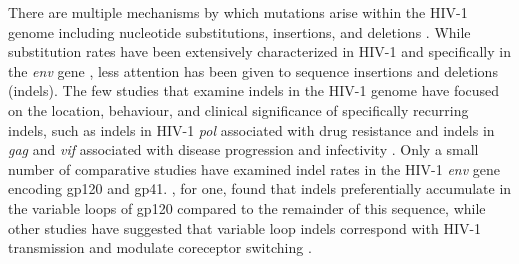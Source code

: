 \documentclass[12pt]{article}
\begin{document}
There are multiple mechanisms by which mutations arise within the HIV-1 genome including nucleotide substitutions, insertions, and deletions \citep{Abram:2010}.
While substitution rates have been extensively characterized in HIV-1 and specifically in the \textit{env} gene \citep{Keulen:1996, Nielsen:1998}, less attention has been given to sequence insertions and deletions (indels).  
The few studies that examine indels in the HIV-1 genome have focused on the location, behaviour, and clinical significance of specifically recurring indels, such as indels in HIV-1 \textit{pol} associated with drug resistance and indels in \textit{gag} and \textit{vif} associated with disease progression and infectivity \citep{Rakik:1999, Aralaguppe:2017, Alexander:2002}. 
Only a small number of comparative studies have examined indel rates in the HIV-1 \textit{env} gene encoding gp120 and gp41.
\citet{wood2009hiv}, for one, found that indels preferentially accumulate in the variable loops of gp120 compared to the remainder of this sequence, while other studies have suggested that variable loop indels correspond with HIV-1 transmission and modulate coreceptor switching \citep{Derdeyn:2004, Tsuchiya:2013}. 
\end{document}
